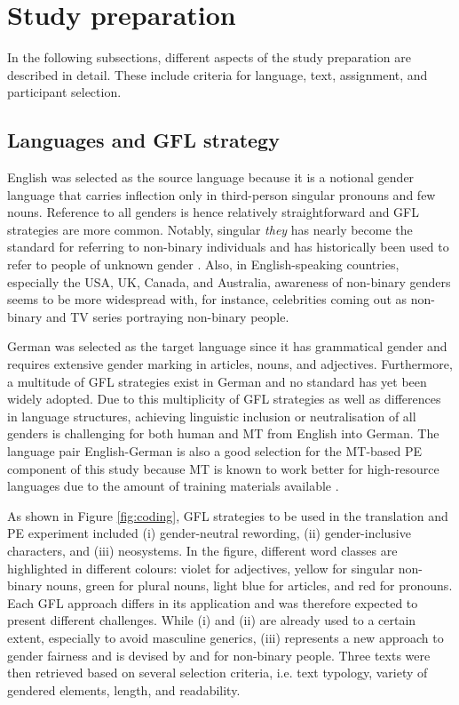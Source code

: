 \section{Study preparation}
In the following subsections, different aspects of the study preparation are described in detail. These include criteria for language, text, assignment, and participant selection.

\subsection{Languages and GFL strategy} \label{sec:texts}

English was selected as the source language because it is a notional gender language that carries inflection only in third-person singular pronouns and few nouns. Reference to all genders is hence relatively straightforward and GFL strategies are more common. Notably, singular \textit{they} has nearly become the standard for referring to non-binary individuals \citep{gendercensus2021} and has historically been used to refer to people of unknown gender \citep{baron2020s}. Also, in English-speaking countries, especially the USA, UK, Canada, and Australia, awareness of non-binary genders seems to be more widespread with, for instance, celebrities coming out as non-binary and TV series portraying non-binary people. 

German was selected as the target language since it has grammatical gender and requires extensive gender marking in articles, nouns, and adjectives. Furthermore, a multitude of GFL strategies exist in German and no standard has yet been widely adopted. Due to this multiplicity of GFL strategies as well as differences in language structures, achieving linguistic inclusion or neutralisation of all genders is challenging for both human and MT from English into German. The language pair English-German is also a good selection for the MT-based PE component of this study because MT is known to work better for high-resource languages due to the amount of training materials available \citep{forcada2017making}.

As shown in Figure \ref{fig:coding}, GFL strategies to be used in the translation and PE experiment included (i) gender-neutral rewording, (ii) gender-inclusive characters, and (iii) neosystems. In the figure, different word classes are highlighted in different colours: violet for adjectives, yellow for singular non-binary nouns, green for plural nouns, light blue for articles, and red for pronouns. Each GFL approach differs in its application and was therefore expected to present different challenges. While (i) and (ii) are already used to a certain extent, especially to avoid masculine generics, (iii) represents a new approach to gender fairness and is devised by and for non-binary people. Three texts were then retrieved based on several selection criteria, i.e. text typology, variety of gendered elements, length, and readability.

